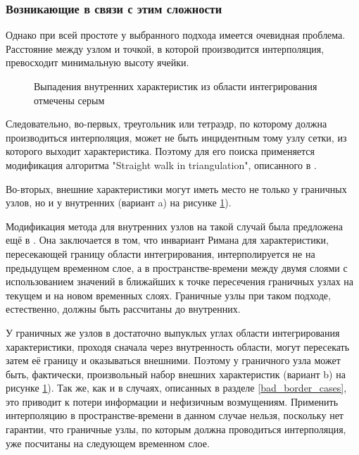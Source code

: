 \documentclass[a4paper]{article}
\numberwithin{equation}{section}
\begin{document}
\subsubsection{Возникающие в связи с этим сложности}
Однако при всей простоте у выбранного подхода имеется очевидная проблема. 
Расстояние между узлом и точкой, в которой производится интерполяция, 
превосходит минимальную высоту ячейки. 
\begin{figure}[H]
	\caption{Выпадения внутренних характеристик из области интегрирования отмечены серым}
	\label{pic:gcm-on-triangles-non-courant}
\end{figure}

Следовательно, во-первых, треугольник или тетраэдр, 
по которому должна производиться интерполяция, 
может не быть инцидентным тому узлу сетки, из которого выходит характеристика. 
Поэтому для его поиска применяется модификация алгоритма "Straight walk in triangulation", 
описанного в \cite{line_walker}.

Во-вторых, внешние характеристики могут 
иметь место не только у граничных узлов, но и у внутренних 
(вариант a) на рисунке \ref{pic:gcm-on-triangles-non-courant}). 

Модификация метода для внутренних узлов на такой случай 
была предложена ещё в \cite{magomedov_kholodov_1988}. Она заключается в том, 
что инвариант Римана для характеристики, пересекающей границу области интегрирования, 
интерполируется не на предыдущем временном слое, а в пространстве-времени между двумя 
слоями с использованием значений в ближайших к точке пересечения граничных узлах 
на текущем и на новом временных слоях. Граничные узлы при таком подходе, 
естественно, должны быть рассчитаны до внутренних.

У граничных же узлов в достаточно выпуклых углах области интегрирования характеристики, 
проходя сначала через внутренность области, могут пересекать затем её границу 
и оказываться внешними. Поэтому у граничного узла может быть, фактически, 
произвольный набор внешних характеристик 
(вариант b) на рисунке \ref{pic:gcm-on-triangles-non-courant}). 
Так же, как и в случаях, описанных в разделе \ref{bad_border_cases}, 
это приводит к потери информации и нефизичным возмущениям. Применить 
интерполяцию в пространстве-времени в данном случае нельзя, поскольку 
нет гарантии, что граничные узлы, по которым должна проводиться интерполяция, 
уже посчитаны на следующем временном слое. 
\end{document}
